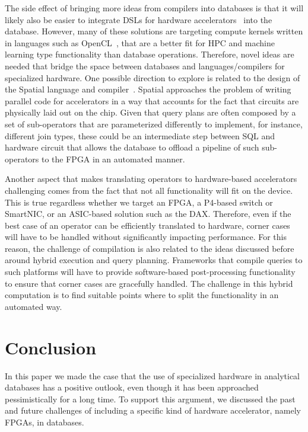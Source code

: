 \documentclass[11pt]{article}
\begin{document}
The side effect of bringing more ideas from compilers into databases is that it will likely also be easier to integrate DSLs for hardware accelerators~\cite{sycl2016}\cite{koeplinger-spatial-pldi18}\cite{maxcompiler} into the database. However, many of these solutions are targeting compute kernels written in languages such as OpenCL~\cite{sycl2016}, that are a better fit for HPC and machine learning type functionality than database operations. Therefore, novel ideas are needed that bridge the space between databases and languages/compilers for specialized hardware. One possible direction to explore is related to the design of the Spatial language and compiler~\cite{koeplinger-spatial-pldi18}. Spatial approaches the problem of writing parallel code for accelerators in a way that accounts for the fact that circuits are physically laid out on the chip. Given that query plans are often composed by a set of sub-operators that are parameterized differently to implement, for instance, different join types, these could be an intermediate step between SQL and hardware circuit that allows the database to offload a pipeline of such sub-operators to the FPGA in an automated manner.

Another aspect that makes translating operators to hardware-based accelerators challenging comes from the fact that not all functionality will fit on the device.  This is true regardless whether we target an FPGA, a P4-based switch or SmartNIC, or an ASIC-based solution such as the DAX. Therefore, even if the best case of an operator can be efficiently translated to hardware, corner cases will have to be handled without significantly impacting performance. For this reason, the challenge of compilation is also related to the ideas discussed before around hybrid execution and query planning. Frameworks that compile queries to such platforms will have to provide software-based post-processing functionality to ensure that corner cases are gracefully handled. The challenge in this hybrid computation is to find suitable points where to split the functionality in an automated way.

\section{Conclusion}

In this paper we made the case that the use of specialized hardware in analytical databases has a positive outlook, even though it has been approached pessimistically for a long time. To support this argument, we discussed the past and future challenges of including a specific kind of hardware accelerator, namely FPGAs, in databases. 
\end{document}
